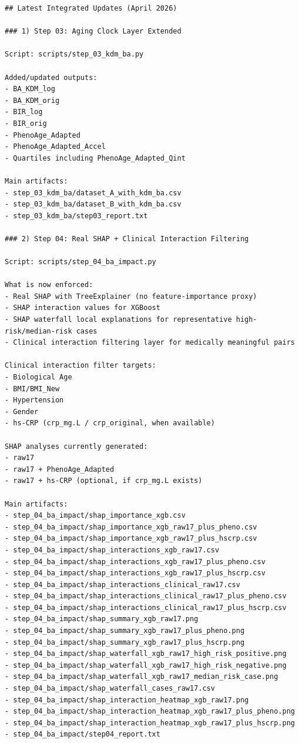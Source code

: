 ﻿\documentclass[11pt,a4paper]{article}
\begin{document}
\begin{verbatim}
## Latest Integrated Updates (April 2026)

### 1) Step 03: Aging Clock Layer Extended

Script: scripts/step_03_kdm_ba.py

Added/updated outputs:
- BA_KDM_log
- BA_KDM_orig
- BIR_log
- BIR_orig
- PhenoAge_Adapted
- PhenoAge_Adapted_Accel
- Quartiles including PhenoAge_Adapted_Qint

Main artifacts:
- step_03_kdm_ba/dataset_A_with_kdm_ba.csv
- step_03_kdm_ba/dataset_B_with_kdm_ba.csv
- step_03_kdm_ba/step03_report.txt

### 2) Step 04: Real SHAP + Clinical Interaction Filtering

Script: scripts/step_04_ba_impact.py

What is now enforced:
- Real SHAP with TreeExplainer (no feature-importance proxy)
- SHAP interaction values for XGBoost
- SHAP waterfall local explanations for representative high-risk/median-risk cases
- Clinical interaction filtering layer for medically meaningful pairs

Clinical interaction filter targets:
- Biological Age
- BMI/BMI_New
- Hypertension
- Gender
- hs-CRP (crp_mg.L / crp_original, when available)

SHAP analyses currently generated:
- raw17
- raw17 + PhenoAge_Adapted
- raw17 + hs-CRP (optional, if crp_mg.L exists)

Main artifacts:
- step_04_ba_impact/shap_importance_xgb.csv
- step_04_ba_impact/shap_importance_xgb_raw17_plus_pheno.csv
- step_04_ba_impact/shap_importance_xgb_raw17_plus_hscrp.csv
- step_04_ba_impact/shap_interactions_xgb_raw17.csv
- step_04_ba_impact/shap_interactions_xgb_raw17_plus_pheno.csv
- step_04_ba_impact/shap_interactions_xgb_raw17_plus_hscrp.csv
- step_04_ba_impact/shap_interactions_clinical_raw17.csv
- step_04_ba_impact/shap_interactions_clinical_raw17_plus_pheno.csv
- step_04_ba_impact/shap_interactions_clinical_raw17_plus_hscrp.csv
- step_04_ba_impact/shap_summary_xgb_raw17.png
- step_04_ba_impact/shap_summary_xgb_raw17_plus_pheno.png
- step_04_ba_impact/shap_summary_xgb_raw17_plus_hscrp.png
- step_04_ba_impact/shap_waterfall_xgb_raw17_high_risk_positive.png
- step_04_ba_impact/shap_waterfall_xgb_raw17_high_risk_negative.png
- step_04_ba_impact/shap_waterfall_xgb_raw17_median_risk_case.png
- step_04_ba_impact/shap_waterfall_cases_raw17.csv
- step_04_ba_impact/shap_interaction_heatmap_xgb_raw17.png
- step_04_ba_impact/shap_interaction_heatmap_xgb_raw17_plus_pheno.png
- step_04_ba_impact/shap_interaction_heatmap_xgb_raw17_plus_hscrp.png
- step_04_ba_impact/step04_report.txt


\end{verbatim}
\end{document}
